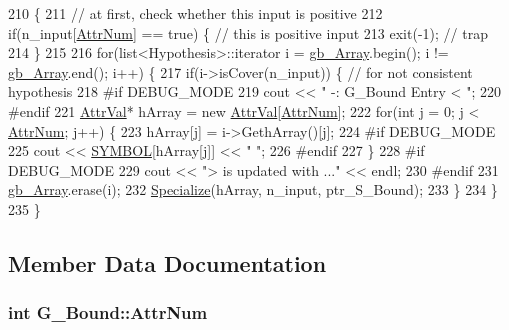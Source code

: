 \begin{DoxyCode}
210                                                           \{
211     \textcolor{comment}{// at first, check whether this input is positive}
212     \textcolor{keywordflow}{if}(n\_input[\hyperlink{class_g___bound_a7f9e3866c5bf5a55f59949e9b2ff4cce}{AttrNum}] == \textcolor{keyword}{true}) \{  \textcolor{comment}{// this is positive input}
213     exit(-1);           \textcolor{comment}{// trap}
214     \}
215     
216     \textcolor{keywordflow}{for}(list<Hypothesis>::iterator i = \hyperlink{class_g___bound_ace60790dcb7f10a2caa157abe1aa838f}{gb\_Array}.begin(); i != \hyperlink{class_g___bound_ace60790dcb7f10a2caa157abe1aa838f}{gb\_Array}.end(); i++) \{
217     \textcolor{keywordflow}{if}(i->isCover(n\_input)) \{  \textcolor{comment}{// for not consistent hypothesis}
218 \textcolor{preprocessor}{#if DEBUG\_MODE}
219 \textcolor{preprocessor}{}        cout << \textcolor{stringliteral}{" -: G\_Bound Entry < "};
220 \textcolor{preprocessor}{#endif}
221 \textcolor{preprocessor}{}        \hyperlink{concept_8h_a9680d29b8d997e4adbf99481b65e897d}{AttrVal}* hArray = \textcolor{keyword}{new} \hyperlink{concept_8h_a9680d29b8d997e4adbf99481b65e897d}{AttrVal}[\hyperlink{class_g___bound_a7f9e3866c5bf5a55f59949e9b2ff4cce}{AttrNum}];
222         \textcolor{keywordflow}{for}(\textcolor{keywordtype}{int} j = 0; j < \hyperlink{class_g___bound_a7f9e3866c5bf5a55f59949e9b2ff4cce}{AttrNum}; j++) \{
223         hArray[j] = i->GethArray()[j];
224 \textcolor{preprocessor}{#if DEBUG\_MODE}
225 \textcolor{preprocessor}{}        cout << \hyperlink{concept_8cpp_a6a0fcd5aed2dc21ce5f79cbe7c3a8e2f}{SYMBOL}[hArray[j]] << \textcolor{stringliteral}{" "};
226 \textcolor{preprocessor}{#endif      }
227 \textcolor{preprocessor}{}        \}
228 \textcolor{preprocessor}{#if DEBUG\_MODE}
229 \textcolor{preprocessor}{}        cout << \textcolor{stringliteral}{"> is updated with ..."} << endl;
230 \textcolor{preprocessor}{#endif}
231 \textcolor{preprocessor}{}        \hyperlink{class_g___bound_ace60790dcb7f10a2caa157abe1aa838f}{gb\_Array}.erase(i);
232         \hyperlink{class_g___bound_a28f2ef635a7a74db831df0f2da088181}{Specialize}(hArray, n\_input, ptr\_S\_Bound);
233     \}
234     \}
235 \}
\end{DoxyCode}


\subsection{Member Data Documentation}
\hypertarget{class_g___bound_a7f9e3866c5bf5a55f59949e9b2ff4cce}{
\subsubsection[{Attr\-Num}]{\setlength{\rightskip}{0pt plus 5cm}int G\-\_\-\-Bound\-::\-Attr\-Num\hspace{0.3cm}{\ttfamily [private]}}}\label{class_g___bound_a7f9e3866c5bf5a55f59949e9b2ff4cce}


